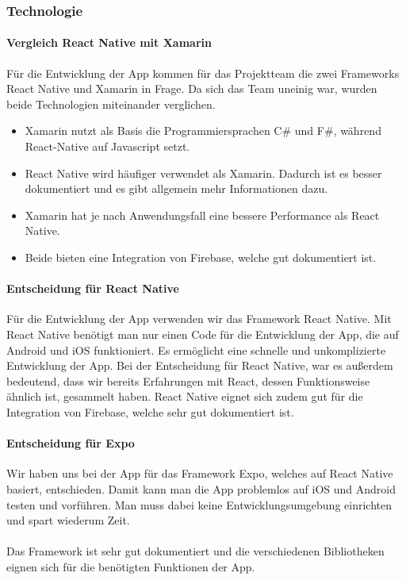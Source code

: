 \subsubsection{Technologie}
\paragraph{Vergleich React Native mit Xamarin}Für die Entwicklung der App kommen für das Projektteam die zwei Frameworks React Native und Xamarin in Frage. Da sich das Team uneinig war, wurden beide Technologien miteinander verglichen.\\

\begin{itemize}
    \item Xamarin nutzt als Basis die Programmiersprachen C\# und F\#, während React-Native auf Javascript setzt. 
    \item React Native wird häufiger verwendet als Xamarin. Dadurch ist es besser dokumentiert und es gibt allgemein mehr Informationen dazu.
    \item Xamarin hat je nach Anwendungsfall eine bessere Performance als React Native.
    \item Beide bieten eine Integration von Firebase, welche gut dokumentiert ist. 
\end{itemize}\cite{vergleich}

\paragraph{Entscheidung für React Native}Für die Entwicklung der App verwenden wir das Framework React Native. Mit React Native benötigt man nur einen Code für die Entwicklung der App, die auf Android und iOS funktioniert. Es ermöglicht eine schnelle und unkomplizierte Entwicklung der App. Bei der Entscheidung für React Native, war es außerdem bedeutend, dass wir bereits Erfahrungen mit React, dessen Funktionsweise ähnlich ist, gesammelt haben. React Native eignet sich zudem gut für die Integration von Firebase, welche sehr gut dokumentiert ist.\cite{reactnative}\\

\paragraph{Entscheidung für Expo}Wir haben uns bei der App für das Framework Expo, welches auf React Native basiert, entschieden. Damit kann man die App problemlos auf iOS und Android testen und vorführen. Man muss dabei keine Entwicklungsumgebung einrichten und spart wiederum Zeit.\\ \\
Das Framework ist sehr gut dokumentiert und die verschiedenen Bibliotheken eignen sich für die benötigten Funktionen der App.\\
